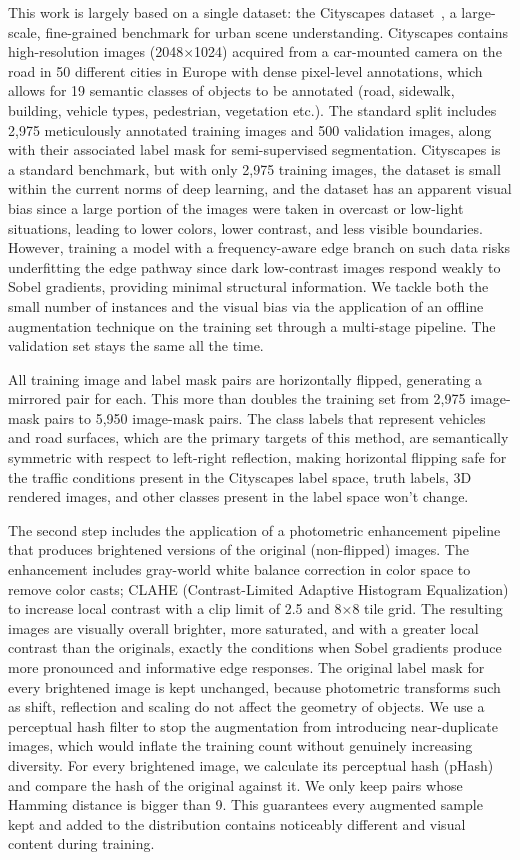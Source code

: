 \documentclass[conference]{IEEEtran}
\begin{document}
This work is largely based on a single dataset: the Cityscapes dataset~\cite{cordts2016cityscapes}, a large-scale, fine-grained
benchmark for urban scene understanding. Cityscapes contains high-resolution images (2048$\times$1024)
acquired from a car-mounted camera on the road in 50 different cities in Europe with dense pixel-level
annotations, which allows for 19 semantic classes of objects to be annotated (road, sidewalk, building,
vehicle types, pedestrian, vegetation etc.). The standard split includes 2,975 meticulously annotated training
images and 500 validation images, along with their associated label mask for semi-supervised
segmentation. Cityscapes is a standard benchmark, but with only 2,975 training images, the dataset is
small within the current norms of deep learning, and the dataset has an apparent visual bias since a large
portion of the images were taken in overcast or low-light situations, leading to lower colors, lower contrast,
and less visible boundaries. However, training a model with a frequency-aware edge branch on such data
risks underfitting the edge pathway since dark low-contrast images respond weakly to Sobel gradients,
providing minimal structural information. We tackle both the small number of instances and the visual
bias via the application of an offline augmentation technique on the training set through a multi-stage
pipeline. The validation set stays the same all the time.

All training image and label mask pairs are horizontally flipped, generating a mirrored pair for each. This
more than doubles the training set from 2,975 image-mask pairs to 5,950 image-mask pairs. The class
labels that represent vehicles and road surfaces, which are the primary targets of this method, are
semantically symmetric with respect to left-right reflection, making horizontal flipping safe for the traffic
conditions present in the Cityscapes label space, truth labels, 3D rendered images, and other classes present
in the label space won't change.

The second step includes the application of a photometric enhancement pipeline that produces brightened
versions of the original (non-flipped) images. The enhancement includes gray-world white balance
correction in color space to remove color casts; CLAHE (Contrast-Limited Adaptive Histogram
Equalization) to increase local contrast with a clip limit of 2.5 and 8$\times$8 tile grid. The resulting images are
visually overall brighter, more saturated, and with a greater local contrast than the originals, exactly the
conditions when Sobel gradients produce more pronounced and informative edge responses. The original
label mask for every brightened image is kept unchanged, because photometric transforms such as shift,
reflection and scaling do not affect the geometry of objects. We use a perceptual hash filter to stop the
augmentation from introducing near-duplicate images, which would inflate the training count without
genuinely increasing diversity. For every brightened image, we calculate its perceptual hash (pHash) and
compare the hash of the original against it. We only keep pairs whose Hamming distance is bigger than 9.
This guarantees every augmented sample kept and added to the distribution contains noticeably different
and visual content during training.
\end{document}

